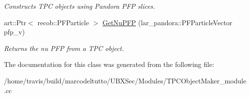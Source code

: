 \begin{DoxyCompactItemize}
\begin{DoxyCompactList}\small\item\em Constructs T\-P\-C objects using Pandora P\-F\-P slices. \end{DoxyCompactList}\item 
art\-::\-Ptr$<$ recob\-::\-P\-F\-Particle $>$ \hyperlink{group__UBXSec_gaf2a3603228fdfebf073653770c7ebb84}{Get\-Nu\-P\-F\-P} (lar\-\_\-pandora\-::\-P\-F\-Particle\-Vector pfp\-\_\-v)
\begin{DoxyCompactList}\small\item\em Returns the nu P\-F\-P from a T\-P\-C object. \end{DoxyCompactList}\end{DoxyCompactItemize}


The documentation for this class was generated from the following file\-:\begin{DoxyCompactItemize}
\item 
/home/travis/build/marcodeltutto/\-U\-B\-X\-Sec/\-Modules/T\-P\-C\-Object\-Maker\-\_\-module.\-cc\end{DoxyCompactItemize}
